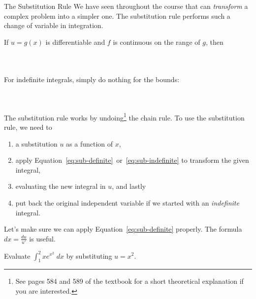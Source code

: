 \documentclass[../main.tex]{subfiles}
\begin{document}
\begin{lesson}{The Substitution Rule}
  We have seen throughout the course that  can \emph{transform} a complex problem into a simpler one. The substitution rule performs such a change of variable in integration.
  \begin{mdframed}[style=withref]
    {If {\color{main} \(u = g(x)\)} is differentiable and \(f\) is continuous on the range of \(g\), then}
    \begin{equation} \label{eq:sub-definite}
      \phantom{\int_{a}^{b} f( {\color{main} g(x)} ) \, {\color{supp} g'(x) \;dx} = \int_{u(a)}^{u(b)} f({\color{main} u}) \;{\color{supp}du}.}
    \end{equation}

    For indefinite integrals, simply do nothing for the bounds: 
    \begin{equation} \label{eq:sub-indefinite}
      \phantom{\int f( {\color{main} g(x)} ) \, {\color{supp} g'(x) \;dx} = \int f(u) \;{\color{supp}du}}
    \end{equation}

  \end{mdframed}
  The substitution rule works by undoing\footnote{See pages 584 and 589 of the textbook for a short theoretical explanation if you are interested.} the chain rule. To use the substitution rule, we need to 
  \begin{enumerate}
    \item \underline{\hspace{1in}} a substitution $u$ as a function of $x$, 
    \item apply Equation~\eqref{eq:sub-definite}~or~\eqref{eq:sub-indefinite} to transform the given integral, 
    \item evaluating the new integral in $u$, and lastly
    \item put back the original independent variable if we started with an \emph{indefinite} integral.
  \end{enumerate}

  \medskip
  Let's make sure we can apply Equation~\eqref{eq:sub-definite} properly.  
  The formula \(dx = \frac{du}{u'}\) is useful.
  \begin{example} \label{ex:u-sub-2}
    Evaluate \(\int_{1}^{2} x e^{x^{2}} \;dx\) by substituting \(u = x^{2}\).
  \end{example}
  \clearpage


\end{lesson}
\end{document}
